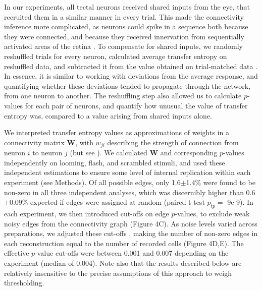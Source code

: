 \documentclass{article}
\begin{document}
In our experiments, all tectal neurons received shared inputs from the eye, that recruited them in a similar manner in every trial. This made the connectivity inference more complicated, as neurons could spike in a sequence both because they were connected, and because they received innervation from sequentially activated areas of the retina \citep{mehler2018lure}. To compensate for shared inputs, we randomly reshuffled trials for every neuron, calculated average transfer entropy on reshuffled data, and subtracted it from the value obtained on trial-matched data \citep{gourevitch2007te, wollstadt2014te}. In essence, it is similar to working with deviations from the average response, and quantifying whether these deviations tended to propagate through the network, from one neuron to another. The reshuffling step also allowed us to calculate $p$-values for each pair of neurons, and quantify how unusual the value of transfer entropy was, compared to a value arising from shared inputs alone.

We interpreted transfer entropy values as approximations of weights in a connectivity matrix $\mathbf{W}$, with $w_{ji}$ describing the strength of connection from neuron $i$ to neuron $j$ (but see \citealt{mehler2018lure}). We calculated $\mathbf{W}$ and corresponding $p$-values independently on looming, flash, and scrambled stimuli, and used these independent estimations to ensure some level of internal replication within each experiment (see Methods). Of all possible edges, only 1.6$\pm$1.4\% were found to be non-zero in all three independent analyses, which was discernibly higher than 0.6$\pm$0.09\% expected if edges were assigned at random (paired t-test $p_{tp}=$ 9e-9). In each experiment, we then introduced cut-offs on edge $p$-values, to exclude weak noisy edges from the connectivity graph (Figure 4C). As noise levels varied across preparations, we adjusted these cut-offs \citep{stetter2012te}, making the number of non-zero edges in each reconstruction equal to the number of recorded cells (Figure 4D,E). The effective $p$-value cut-offs were between 0.001 and 0.007 depending on the experiment (median of 0.004). Note also that the results described below are relatively insensitive to the precise assumptions of this approach to weigh thresholding.
\end{document}
